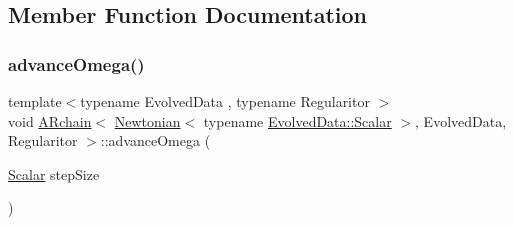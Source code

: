 \subsection{Member Function Documentation}
\mbox{\label{class_a_rchain_3_01_newtonian_3_01typename_01_evolved_data_1_1_scalar_01_4_00_01_evolved_data_00_01_regularitor_01_4_a8427d55e9b05fca4a1db2b9024940e06}} 
\subsubsection{\texorpdfstring{advance\+Omega()}{advanceOmega()}}
{\footnotesize\ttfamily template$<$typename Evolved\+Data , typename Regularitor $>$ \\
void \mbox{\hyperlink{class_a_rchain}{A\+Rchain}}$<$ \mbox{\hyperlink{class_newtonian}{Newtonian}}$<$ typename \mbox{\hyperlink{class_a_rchain_a707e42a79e4744424a34c9007e84ee07}{Evolved\+Data\+::\+Scalar}} $>$, Evolved\+Data, Regularitor $>$\+::advance\+Omega (\begin{DoxyParamCaption}\item[{\mbox{\hyperlink{class_a_rchain_3_01_newtonian_3_01typename_01_evolved_data_1_1_scalar_01_4_00_01_evolved_data_00_01_regularitor_01_4_a2c77dc1b58a25ac5c6ee95dd7809f693}{Scalar}}}]{step\+Size }\end{DoxyParamCaption})\hspace{0.3cm}{\ttfamily [private]}}

